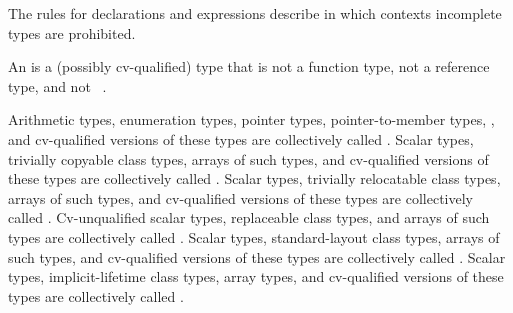 \pnum
\begin{note}
The rules for declarations and expressions describe in which
contexts incomplete types are prohibited.
\end{note}

\pnum
\label{term.object.type}%
An  is a (possibly cv-qualified) type that is not
a function type, not a reference type, and not \cv{}~.

\pnum
{}%
%
%
\label{term.scalar.type}%
Arithmetic types, enumeration types,
pointer types, pointer-to-member types,
,
and
cv-qualified versions of these
types are collectively called
.
\label{term.trivially.copyable.type}%
Scalar types, trivially copyable class types,
arrays of such types, and cv-qualified versions of these
types are collectively called .
\label{term.trivially.relocatable.type}%
Scalar types, trivially relocatable class types,
arrays of such types, and cv-qualified versions of these
types are collectively called .
\label{term.replaceable.type}%
Cv-unqualified scalar types, replaceable class types, and
arrays of such types are collectively called
.
\label{term.standard.layout.type}%
Scalar types, standard-layout class
types, arrays of such types, and
cv-qualified versions of these types
are collectively called .
\label{term.implicit.lifetime.type}%
Scalar types, implicit-lifetime class types,
array types, and cv-qualified versions of these types
are collectively called .

